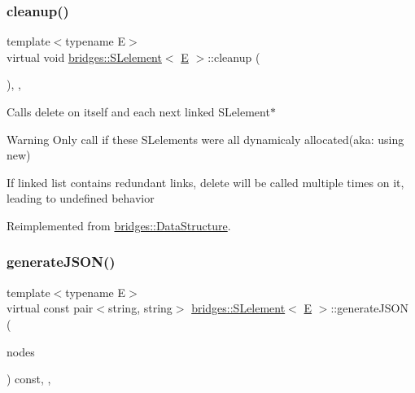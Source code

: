 \subsubsection{\texorpdfstring{cleanup()}{cleanup()}}
{\footnotesize\ttfamily template$<$typename E$>$ \\
virtual void \mbox{\hyperlink{classbridges_1_1_s_lelement}{bridges\+::\+S\+Lelement}}$<$ \mbox{\hyperlink{namespacebridges_acfb0a4f7877d8f63de3e6862004c50eda3a3ea00cfc35332cedf6e5e9a32e94da}{E}} $>$\+::cleanup (\begin{DoxyParamCaption}{ }\end{DoxyParamCaption})\hspace{0.3cm}{\ttfamily [inline]}, {\ttfamily [override]}, {\ttfamily [virtual]}}

Calls delete on itself and each next linked S\+Lelement$\ast$

\begin{DoxyWarning}{Warning}
Only call if these S\+Lelements were all dynamicaly allocated(aka\+: using new) 

If linked list contains redundant links, delete will be called multiple times on it, leading to undefined behavior 
\end{DoxyWarning}


Reimplemented from \mbox{\hyperlink{classbridges_1_1_data_structure_ac3ad75810fd77f0ad35b9b5123d2c8f8}{bridges\+::\+Data\+Structure}}.

\mbox{\label{classbridges_1_1_s_lelement_a876b5af820b5fdac4854ace6a9c2e2a5}} 
\subsubsection{\texorpdfstring{generateJSON()}{generateJSON()}}
{\footnotesize\ttfamily template$<$typename E$>$ \\
virtual const pair$<$string, string$>$ \mbox{\hyperlink{classbridges_1_1_s_lelement}{bridges\+::\+S\+Lelement}}$<$ \mbox{\hyperlink{namespacebridges_acfb0a4f7877d8f63de3e6862004c50eda3a3ea00cfc35332cedf6e5e9a32e94da}{E}} $>$\+::generate\+J\+S\+ON (\begin{DoxyParamCaption}\item[{vector$<$ const \mbox{\hyperlink{classbridges_1_1_s_lelement}{S\+Lelement}}$<$ \mbox{\hyperlink{namespacebridges_acfb0a4f7877d8f63de3e6862004c50eda3a3ea00cfc35332cedf6e5e9a32e94da}{E}} $>$ $\ast$ $>$}]{nodes }\end{DoxyParamCaption}) const\hspace{0.3cm}{\ttfamily [inline]}, {\ttfamily [protected]}, {\ttfamily [virtual]}}

